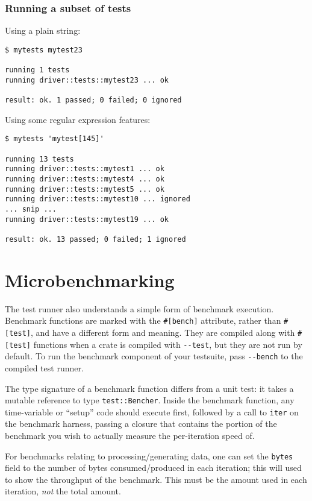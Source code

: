 \documentclass[]{article}
\begin{document}
\subsubsection{Running a subset of
tests}\label{running-a-subset-of-tests}

Using a plain string:

\begin{verbatim}
$ mytests mytest23

running 1 tests
running driver::tests::mytest23 ... ok

result: ok. 1 passed; 0 failed; 0 ignored
\end{verbatim}

Using some regular expression features:

\begin{verbatim}
$ mytests 'mytest[145]'

running 13 tests
running driver::tests::mytest1 ... ok
running driver::tests::mytest4 ... ok
running driver::tests::mytest5 ... ok
running driver::tests::mytest10 ... ignored
... snip ...
running driver::tests::mytest19 ... ok

result: ok. 13 passed; 0 failed; 1 ignored
\end{verbatim}

\section{Microbenchmarking}\label{microbenchmarking}

The test runner also understands a simple form of benchmark execution.
Benchmark functions are marked with the \texttt{\#{[}bench{]}}
attribute, rather than \texttt{\#{[}test{]}}, and have a different form
and meaning. They are compiled along with \texttt{\#{[}test{]}}
functions when a crate is compiled with \texttt{-\/-test}, but they are
not run by default. To run the benchmark component of your testsuite,
pass \texttt{-\/-bench} to the compiled test runner.

The type signature of a benchmark function differs from a unit test: it
takes a mutable reference to type \texttt{test::Bencher}. Inside the
benchmark function, any time-variable or ``setup'' code should execute
first, followed by a call to \texttt{iter} on the benchmark harness,
passing a closure that contains the portion of the benchmark you wish to
actually measure the per-iteration speed of.

For benchmarks relating to processing/generating data, one can set the
\texttt{bytes} field to the number of bytes consumed/produced in each
iteration; this will used to show the throughput of the benchmark. This
must be the amount used in each iteration, \emph{not} the total amount.
\end{document}
